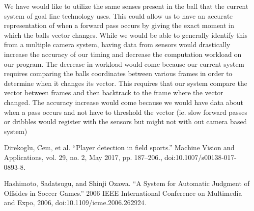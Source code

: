 \documentclass[letterpaper, 10 pt, conference]{ieeeconf}  %
\begin{document}
We have would like to utilize the same senses present in the ball that the current system of goal line technology uses. This could allow us to have an accurate representation of when a forward pass occurs by giving the exact moment in which the balls vector changes. While we would be able to generally identify this from a multiple camera system, having data from sensors would drastically increase the accuracy of our timing and decrease the computation workload on our program. The decrease in workload would come because our current system requires comparing the balls coordinates between various frames in order to determine when it changes its vector. This requires that our system compare the vector between frames and then backtrack to the frame where the vector changed. The accuracy increase would come because we would have data about when a pass occurs and not have to threshold the vector (ie. slow forward passes or dribbles would register with the sensors but might not with out camera based system) 



\addtolength{\textheight}{-12cm}   %


\begin{thebibliography}{99}

 Direkoglu, Cem, et al. “Player detection in field sports.” Machine Vision and 
Applications, vol. 29, no. 2, May 2017, pp. 187–206., doi:10.1007/s00138-017-0893-8.

Hashimoto, Sadatsugu, and Shinji Ozawa. “A System for Automatic Judgment of 
Offsides in Soccer Games.” 2006 IEEE International Conference on Multimedia and Expo, 2006, doi:10.1109/icme.2006.262924.


\end{thebibliography}
\end{document}
